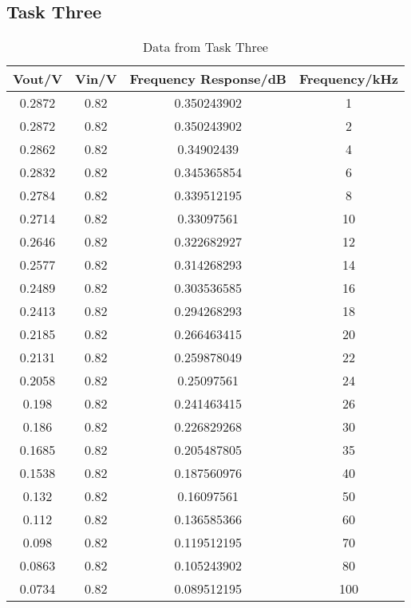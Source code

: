 \documentclass[12pt]{article}
\begin{document}
    \subsection{Task Three}
    \begin{table}[H]
    \centering
    \caption{Data from Task Three}
    \begin{tabular}{c c c c}
    \hline
    Vout/V & Vin/V &  Frequency Response/dB & Frequency/kHz \\
    \hline
    0.2872 & 0.82 & 0.350243902 & 1   \\
    0.2872 & 0.82 & 0.350243902 & 2   \\
    0.2862 & 0.82 & 0.34902439  & 4   \\
    0.2832 & 0.82 & 0.345365854 & 6   \\
    0.2784 & 0.82 & 0.339512195 & 8   \\
    0.2714 & 0.82 & 0.33097561  & 10  \\
    0.2646 & 0.82 & 0.322682927 & 12  \\
    0.2577 & 0.82 & 0.314268293 & 14  \\
    0.2489 & 0.82 & 0.303536585 & 16  \\
    0.2413 & 0.82 & 0.294268293 & 18  \\
    0.2185 & 0.82 & 0.266463415 & 20  \\
    0.2131 & 0.82 & 0.259878049 & 22  \\
    0.2058 & 0.82 & 0.25097561  & 24  \\
    0.198  & 0.82 & 0.241463415 & 26  \\
    0.186  & 0.82 & 0.226829268 & 30  \\
    0.1685 & 0.82 & 0.205487805 & 35  \\
    0.1538 & 0.82 & 0.187560976 & 40  \\
    0.132  & 0.82 & 0.16097561  & 50  \\
    0.112  & 0.82 & 0.136585366 & 60  \\
    0.098  & 0.82 & 0.119512195 & 70  \\
    0.0863 & 0.82 & 0.105243902 & 80  \\
    0.0734 & 0.82 & 0.089512195 & 100 \\
    \hline
    \end{tabular}
    \end{table}
\end{document}
